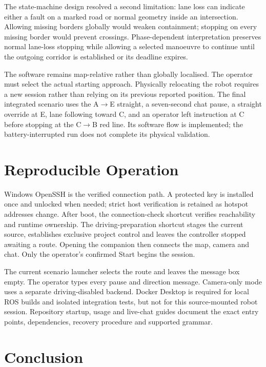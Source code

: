 \documentclass[10pt,a4paper,twocolumn]{article}
\begin{document}
The state-machine design resolved a second limitation: lane loss can indicate
either a fault on a marked road or normal geometry inside an intersection.
Allowing missing borders globally would weaken containment; stopping on every
missing border would prevent crossings. Phase-dependent interpretation preserves
normal lane-loss stopping while allowing a selected manoeuvre to continue until
the outgoing corridor is established or its deadline expires.

The software remains map-relative rather than globally localised. The operator
must select the actual starting approach. Physically relocating the robot
requires a new session rather than relying on its previous reported position.
The final integrated scenario uses the A$\rightarrow$E straight, a seven-second
chat pause, a straight override at E, lane following toward C, and an operator
left instruction at C before stopping at the C$\rightarrow$B red line. Its
software flow is implemented; the battery-interrupted run does not complete
its physical validation.

\section{Reproducible Operation}

Windows OpenSSH is the verified connection path. A protected key is installed
once and unlocked when needed; strict host verification is retained as hotspot
addresses change. After boot, the connection-check shortcut verifies reachability
and runtime ownership. The driving-preparation shortcut stages the current
source, establishes exclusive project control and leaves the controller stopped
awaiting a route. Opening the companion then connects the map, camera and chat.
Only the operator's confirmed Start begins the session.

The current scenario launcher selects the route and leaves the message box
empty. The operator types every pause and direction message. Camera-only mode
uses a separate driving-disabled backend. Docker Desktop is required for local
ROS builds and isolated integration tests, but not for this source-mounted
robot session. Repository startup, usage and live-chat guides document the
exact entry points, dependencies, recovery procedure and supported grammar.

\section{Conclusion}
\end{document}

